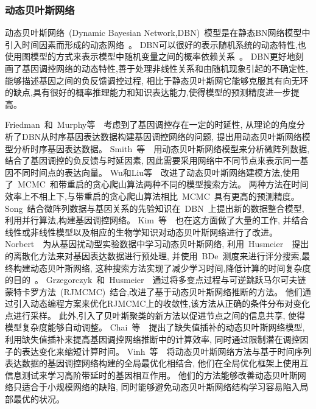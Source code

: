 \subsubsection{动态贝叶斯网络}
动态贝叶斯网络~(Dynamic Bayesian Network,DBN)~模型是在静态BN网络模型中引入时间因素而形成的动态网络~\cite{dondelinger2010heterogeneous,grzegorczyk2010improvements}。
DBN可以很好的表示随机系统的动态特性,也使用图模型的方式来表示模型中随机变量之间的概率依赖关系~\cite{hecker2009gene}。
DBN更好地刻画了基因调控网络的动态特性,善于处理非线性关系和由随机现象引起的不确定性,能够描述基因之间的负反馈调控过程,
相比于静态贝叶斯网它能够克服其有向无环的缺点,具有很好的概率推理能力和知识表达能力,使得模型的预测精度进一步提高。

Friedman~和~Murphy等~\cite{friedman2004inferring}~考虑到了基因调控存在一定的时延性,
从理论的角度分析了DBN从时序基因表达数据构建基因调控网络的问题, 提出用动态贝叶斯网络模型分析时序基因表达数据。
Smith~等~\cite{smith2006computational}~用动态贝叶斯网络模型来分析微阵列数据,
结合了基因调控的负反馈与时延因素, 因此需要采用网络中不同节点来表示同一基因不同时间点的表达向量。
Wu和Liu等~\cite{wu2008dynamic}~改进了动态贝叶斯网络建模方法,使用了~MCMC~和带重启的贪心爬山算法两种不同的模型搜索方法。 
两种方法在时间效率上不相上下,与带重启的贪心爬山算法相比~MCMC~具有更高的预测精度。
Song~\cite{song2009keller}结合微阵列数据与基因关系的先验知识在~DBN~上提出新的数据整合模型,利用并行算法,构建基因调控网络。
Kim~等~\cite{del2010efficient}~也在这方面做了大量的工作,
并结合线性或非线性模型以及相应的生物学知识对动态贝叶斯网络进行了改进。
Norbert~\cite{netrapalli2010greedy}~为从基因扰动型实验数据中学习动态贝叶斯网络,
利用~Husmeier~\cite{werhli2006comparative}~提出的离散化方法来对基因表达数据进行预处理,
并使用~BDe~测度来进行评分搜索,最终构建动态贝叶斯网络, 这种搜索方法实现了减少学习时间,降低计算的时间复杂度的目的~\cite{hurley2011gene}。
Grzegorczyk~和~Husmeier~\cite{grzegorczyk2010improvements}~通过将多变点过程与可逆跳跃马尔可夫链蒙特卡罗方法~(RJMCMC)~结合,改进了基于动态贝叶斯网络推断的方法。 他们通过引入动态编程方案来优化RJMCMC上的收敛性,该方法从正确的条件分布对变化点进行采样。 
此外,引入了贝叶斯聚类的新方法以促进节点之间的信息共享, 使得模型复杂度能够自动调整。
Chai~等~\cite{chai2012inferring}~提出了缺失值插补的动态贝叶斯网络模型,
利用缺失值插补来提高基因调控网络推断中的计算效率,
同时通过限制潜在调控因子的表达变化来缩短计算时间。
Vinh~等~\cite{vinh2012gene}~将动态贝叶斯网络方法与基于时间序列表达数据的基因调控网络构建的全局最优化相结合,
他们在全局优化框架上使用互信息测试来学习高阶带延时的基因相互作用。
他们的方法能够改善动态贝叶斯网络只适合于小规模网络的缺陷,
同时能够避免动态贝叶斯网络结构学习容易陷入局部最优的状况。

